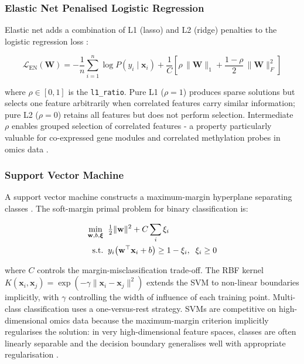 \subsubsection{Elastic Net Penalised Logistic Regression}

Elastic net adds a combination of L1 (lasso) and L2 (ridge) penalties to the logistic regression loss \parencite{ZouHastie2005}:

\begin{equation}
\mathcal{L}_{\mathrm{EN}}(\mathbf{W}) =
    -\frac{1}{n}\sum_{i=1}^{n} \log P(y_i \mid \mathbf{x}_i)
    + \frac{1}{C}\!\left[
        \rho\,\|\mathbf{W}\|_1
        + \frac{1-\rho}{2}\,\|\mathbf{W}\|_F^2
    \right]
\label{eq:en_loss}
\end{equation}
 
where $\rho \in [0,1]$ is the \texttt{l1\_ratio}. Pure L1 ($\rho=1$) produces sparse solutions but selects one feature arbitrarily when correlated features carry similar information; pure L2 ($\rho=0$) retains all features but does not perform selection. Intermediate $\rho$ enables grouped selection of correlated features - a property particularly valuable for co-expressed gene modules and correlated methylation probes in omics data \parencite{ZouHastie2005}.


\subsubsection{Support Vector Machine}

A support vector machine constructs a maximum-margin hyperplane separating classes \parencite{Cortes1995}. The soft-margin primal problem for binary classification is:

\begin{align}
\min_{\mathbf{w},b,\boldsymbol{\xi}} \;\;
    &\tfrac{1}{2}\|\mathbf{w}\|^2 + C\sum_{i}\xi_i
    \label{eq:svm_primal}\\
\text{s.t.}\;\;
    &y_i\bigl(\mathbf{w}^\top\mathbf{x}_i + b\bigr)
    \geq 1 - \xi_i,\;\; \xi_i \geq 0 \notag
\end{align}

where $C$ controls the margin-misclassification trade-off. The RBF kernel $K(\mathbf{x}_i,\mathbf{x}_j) = \exp(-\gamma\|\mathbf{x}_i - \mathbf{x}_j\|^2)$ extends the SVM to non-linear boundaries implicitly, with $\gamma$ controlling the width of influence of each training point. Multi-class classification uses a one-versus-rest strategy. SVMs are competitive on high-dimensional omics data because the maximum-margin criterion implicitly regularises the solution: in very high-dimensional feature spaces, classes are often linearly separable and the decision boundary generalises well with appropriate regularisation \parencite{Vapnik1995}.


